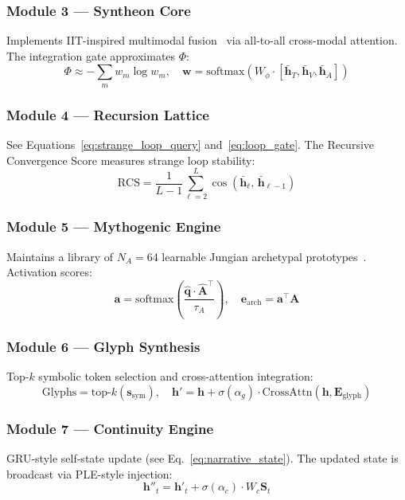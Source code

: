 \documentclass[conference]{IEEEtran}
\begin{document}
\subsubsection{Module 3 --- Syntheon Core}
Implements IIT-inspired multimodal fusion~\cite{tononi2008} via all-to-all
cross-modal attention. The integration gate approximates $\Phi$:
\begin{equation}
\Phi \approx -\sum_m w_m \log w_m, \quad
\mathbf{w} = \text{softmax}(W_\phi \cdot [\bar{\mathbf{h}}_T, \bar{\mathbf{h}}_V,
\bar{\mathbf{h}}_A])
\end{equation}

\subsubsection{Module 4 --- Recursion Lattice}
See Equations~\ref{eq:strange_loop_query} and~\ref{eq:loop_gate}. The
Recursive Convergence Score measures strange loop stability:
\begin{equation}
\text{RCS} = \frac{1}{L-1}\sum_{\ell=2}^{L}
\cos\!\left(\bar{\mathbf{h}}_\ell,\, \bar{\mathbf{h}}_{\ell-1}\right)
\end{equation}

\subsubsection{Module 5 --- Mythogenic Engine}
Maintains a library of $N_A = 64$ learnable Jungian archetypal
prototypes~\cite{jung1959}. Activation scores:
\begin{equation}
\mathbf{a} = \text{softmax}\!\left(
\frac{\hat{\mathbf{q}} \cdot \hat{\mathbf{A}}^\top}{\tau_A}
\right), \quad
\mathbf{e}_\text{arch} = \mathbf{a}^\top \mathbf{A}
\end{equation}

\subsubsection{Module 6 --- Glyph Synthesis}
Top-$k$ symbolic token selection and cross-attention integration:
\begin{equation}
\text{Glyphs} = \text{top-}k(\mathbf{s}_\text{sym}), \quad
\mathbf{h}' = \mathbf{h} + \sigma(\alpha_g) \cdot \text{CrossAttn}(\mathbf{h},
\mathbf{E}_\text{glyph})
\end{equation}

\subsubsection{Module 7 --- Continuity Engine}
GRU-style self-state update (see Eq.~\ref{eq:narrative_state}). The
updated state is broadcast via PLE-style injection:
\begin{equation}
\mathbf{h}''_t = \mathbf{h}'_t + \sigma(\alpha_c) \cdot W_c \mathbf{S}_t
\end{equation}
\end{document}

